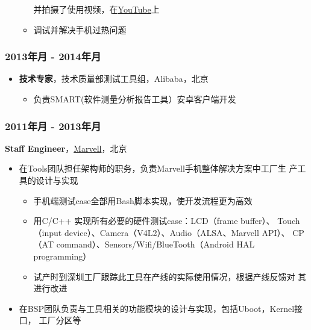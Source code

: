 \documentclass[11pt,dvipdfmx,CJKbookmarks]{article}
\begin{document}
\begin{CJK*}{UTF8}{simsun}
\begin{itemize}
\begin{itemize}
并拍摄了使用视频，在\thinspace \href{https://www.youtube.com/watch?v\%3Dre_bECYY0rM&app\%3Ddesktop}{YouTube}\thinspace 上
\item 调试并解决手机过热问题
\end{itemize}
\end{itemize}

\subsubsection{2013\thinspace 年\thinspace 月 - 2014\thinspace 年\thinspace 月}
\label{sec-1-0-2}
\begin{itemize}
\item \textbf{技术专家}，技术质量部测试工具组，Alibaba，北京
\begin{itemize}
\item 负责\thinspace SMART(软件测量分析报告工具）安卓客户端开发
\end{itemize}
\end{itemize}

\subsubsection{2011\thinspace 年\thinspace 月 - 2013\thinspace 年\thinspace 月}
\label{sec-1-0-3}
\textbf{Staff Engineer}，\href{http://marvell.com}{Marvell}，北京

\begin{itemize}
\item 在\thinspace Tools\thinspace 团队担任架构师的职务，负责\thinspace Marvell\thinspace 手机整体解决方案中工厂生
产工具的设计与实现
\begin{itemize}
\item 手机端测试\thinspace case\thinspace 全部用\thinspace Bash\thinspace 脚本实现，使开发流程更为高效

\item 用\thinspace C/C++ 实现所有必要的硬件测试\thinspace case：LCD（frame buffer）、
Touch（input device）、Camera（V4L2）、Audio（ALSA、Marvell API）、
CP（AT command）、Sensors/Wifi/BlueTooth（Android HAL
programming）

\item 试产时到深圳工厂跟踪此工具在产线的实际使用情况，根据产线反馈对
其进行改进
\end{itemize}

\item 在\thinspace BSP\thinspace 团队负责与工具相关的功能模块的设计与实现，包括\thinspace Uboot，Kernel\thinspace 接口，
工厂分区等


\end{itemize}
\end{CJK*}
\end{document}
